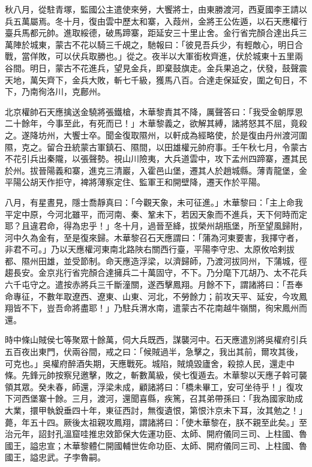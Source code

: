\begin{pinyinscope}
 秋八月，從駐青塚，監國公主遣使來勞，大饗將士，由東勝渡河，西夏國李王請以兵五萬屬焉。冬十月，復由雲中歷太和寨，入葭州，金將王公佐遁，以石天應權行臺兵馬都元帥。進取綏德，破馬蹄寨，距延安三十里止舍。金行省完顏合達出兵三萬陣於城東，蒙古不花以騎三千覘之，馳報曰：「彼見吾兵少，有輕敵心，明日合戰，當佯敗，可以伏兵取勝也。」從之。夜半以大軍銜枚齊進，伏於城東十五里兩谷間。明日，蒙古不花進兵，望見金兵，即棄鼓旗走。金兵果追之，伏發，鼓聲震天地，萬矢齊下，金兵大敗，斬七千級，獲馬八百。合達走保延安，圍之旬日，不下，乃南徇洛川，克鄜州。



 北京權帥石天應擒送金驍將張鐵槍，木華黎責其不降，厲聲答曰：「我受金朝厚恩二十餘年，今事至此，有死而已！」木華黎義之，欲解其縛，諸將怒其不屈，竟殺之。遂降坊州，大饗士卒。聞金復取隰州，以軒成為經略使，於是復由丹州渡河圍隰，克之。留合丑統蒙古軍鎮石、隰間，以田雄權元帥府事。壬午秋七月，令蒙古不花引兵出秦隴，以張聲勢。視山川險夷，大兵道雲中，攻下孟州四蹄寨，遷其民於州。拔晉陽義和寨，進克三清巖，入霍邑山堡，遷其人於趙城縣。薄青龍堡，金平陽公胡天作拒守，裨將薄察定住、監軍王和開壁降，遷天作於平陽。



 八月，有星晝見，隱士喬靜真曰：「今觀天象，未可征進。」木華黎曰：「主上命我平定中原，今河北雖平，而河南、秦、鞏未下，若因天象而不進兵，天下何時而定耶？且違君命，得為忠乎！」冬十月，過晉至絳，拔榮州胡瓶堡，所至望風歸附，河中久為金有，至是復來歸。木華黎召石天應謂曰：「蒲為河東要害，我擇守者，非君不可。」乃以天應權河東南北路陜右關西行臺，平陽李守忠、太原攸哈剌拔都、隰州田雄，並受節制。命天應造浮梁，以濟歸師，乃渡河拔同州，下蒲城，徑趨長安。金京兆行省完顏合達擁兵二十萬固守，不下。乃分麾下兀胡乃、太不花兵六千屯守之。遣按赤將兵三千斷潼關，遂西擊鳳翔。月餘不下，謂諸將曰：「吾奉命專征，不數年取遼西、遼東、山東、河北，不勞餘力；前攻天平、延安，今攻鳳翔皆不下，豈吾命將盡耶！」乃駐兵渭水南，遣蒙古不花南越牛嶺關，徇宋鳳州而還。



 時中條山賊侯七等聚眾十餘萬，伺大兵既西，謀襲河中。石天應遣別將吳權府引兵五百夜出東門，伏兩谷間，戒之曰：「候賊過半，急擊之，我出其前，爾攻其後，可克也。」吳權府醉酒失期，天應戰死。城陷，賊燒毀廬舍，殺掠人民，還走中條。先鋒元帥按察兒邀擊，敗之，斬數萬級，侯七復遁去。木華黎以天應子斡可襲領其眾。癸未春，師還，浮梁未成，顧諸將曰：「橋未畢工，安可坐待乎！」復攻下河西堡寨十餘。三月，渡河，還聞喜縣，疾篤，召其弟帶孫曰：「我為國家助成大業，擐甲執銳垂四十年，東征西討，無復遺恨，第恨汴京未下耳，汝其勉之！」薨，年五十四。厥後太祖親攻鳳翔，謂諸將曰：「使木華黎在，朕不親至此矣。」至治元年，詔封孔溫窟哇推忠效節保大佐運功臣、太師、開府儀同三司、上柱國、魯國王，謚忠宣；木華黎體仁開國輔世佐命功臣、太師、開府儀同三司、上柱國、魯國王，謚忠武。子孛魯嗣。




\end{pinyinscope}
